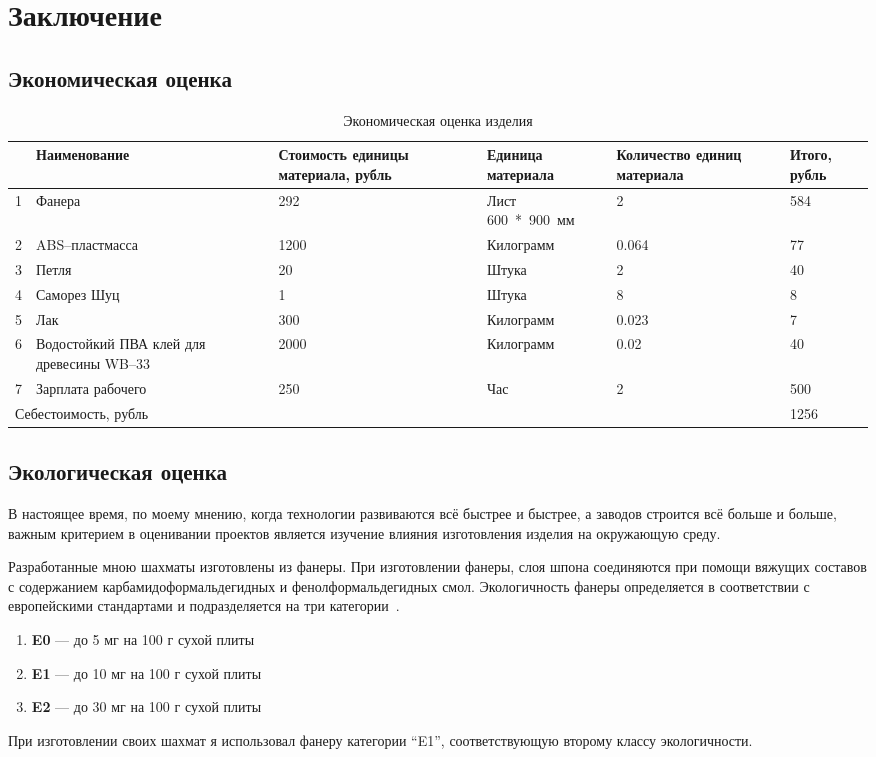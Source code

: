 \section{Заключение}
\subsection{Экономическая оценка}
\begin{table}[H]
    \centering
    \caption{Экономическая оценка изделия}\label{tab:economic}
    \vspace{1em}
        \begin{tabular}{p{1.1em} p{9em} p{5em} p{6em} p{6em} p{3em}}
        \toprule
         & Наименование & Стоимость единицы материала, рубль & Единица
        \mbox{материала} & Количество единиц материала & Итого, рубль \\
        \midrule
        1 & Фанера & 292 & Лист \mbox{600 * 900 мм} & 2 & 584 \\
        \midrule
        2 & ABS--пластмасса & 1200 & Килограмм & 0.064 & 77 \\
        \midrule
        3 & Петля & 20 & Штука & 2 & 40 \\
        \midrule
        4 & Саморез Шуц & 1 & Штука & 8 & 8 \\
        \midrule
        5 & Лак & 300 & Килограмм & 0.023 & 7 \\
        \midrule
        6 & Водостойкий ПВА клей для древесины WB--33 & 2000 & Килограмм & 0.02 & 40 \\
        \midrule
        7 & Зарплата рабочего & 250 & Час & 2 & 500 \\
        \bottomrule
        \multicolumn{5}{l}{Себестоимость, рубль} & 1256 \\
        \bottomrule
    \end{tabular}
\end{table}

\subsection{Экологическая оценка}
В настоящее время, по моему мнению, когда технологии развиваются всё быстрее и
быстрее, а заводов строится всё больше и больше, важным критерием в оценивании
проектов является изучение влияния изготовления изделия на окружающую среду.

Разработанные мною шахматы изготовлены из фанеры. При изготовлении фанеры, слоя
шпона соединяются при помощи вяжущих составов с содержанием
карбамидоформальдегидных и фенолформальдегидных смол. Экологичность фанеры
определяется в соответствии с европейскими стандартами и подразделяется на три
категории~\cite{web:merani}.
\begin{enumerate}
    \item \textbf{E0} --- до 5 мг на 100 г сухой плиты
    \item \textbf{E1} --- до 10 мг на 100 г сухой плиты
    \item \textbf{E2} --- до 30 мг на 100 г сухой плиты
\end{enumerate}
При изготовлении своих шахмат я использовал фанеру категории ``E1'',
соответствующую второму классу экологичности.

